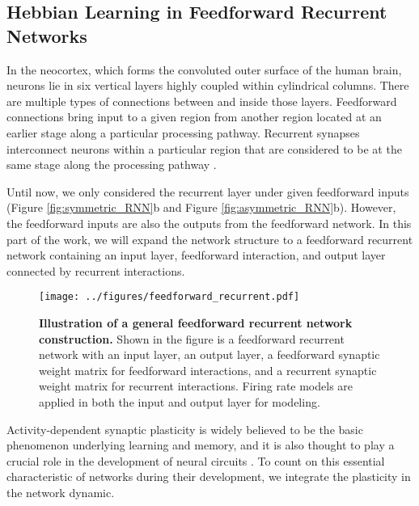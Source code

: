 \documentclass[11pt]{article}
\begin{document}
	\subsection{Hebbian Learning in Feedforward Recurrent Networks} \label{sec:Hebb_learn}
	In the neocortex, which forms the convoluted outer surface of the human brain, neurons lie in six vertical layers highly coupled within cylindrical columns. There are multiple types of connections between and inside those layers. Feedforward connections bring input to a given region from another region located at an earlier stage along a particular processing pathway. Recurrent synapses interconnect neurons within a particular region that are considered to be at the same stage along the processing pathway \cite{dayan2005theoretical}. 
	
	Until now, we only considered the recurrent layer under given feedforward inputs (Figure \ref{fig:symmetric_RNN}b and Figure \ref{fig:asymmetric_RNN}b). However, the feedforward inputs are also the outputs from the feedforward network. In this part of the work, we will expand the network structure to a feedforward recurrent network containing an input layer, feedforward interaction, and output layer connected by recurrent interactions.
	
		\begin{figure}[H]
			\centering
			\texttt{[image: ../figures/feedforward\_recurrent.pdf]}
			\caption[Illustration of a general feedforward recurrent network construction]{\textbf{Illustration of a general feedforward recurrent network construction.} Shown in the figure is a feedforward recurrent network with an input layer, an output layer, a feedforward synaptic weight matrix for feedforward interactions, and a recurrent synaptic weight matrix for recurrent interactions. Firing rate models are applied in both the input and output layer for modeling.}
			\label{fig:feedforward_recurrent_network}
		\end{figure} 
	
	Activity-dependent synaptic plasticity is widely believed to be the basic phenomenon underlying learning and memory, and it is also thought to play a crucial role in the development of neural circuits \cite{dayan2005theoretical}. To count on this essential characteristic of networks during their development, we integrate the plasticity in the network dynamic. 
	
\end{document}
